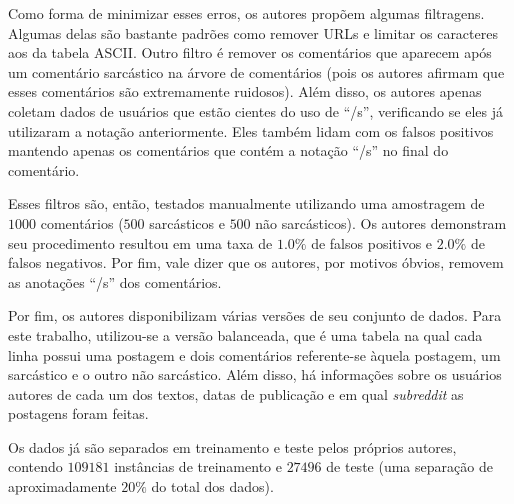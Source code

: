 Como forma de minimizar esses erros, os autores propõem algumas filtragens.
Algumas delas são bastante padrões como remover URLs e limitar os caracteres aos
da tabela ASCII. Outro filtro é remover os comentários que aparecem após um
comentário sarcástico na árvore de comentários (pois os autores afirmam que
esses comentários são extremamente ruidosos). Além disso, os autores apenas
coletam dados de usuários que estão cientes do uso de ``/s'', verificando se
eles já utilizaram a notação anteriormente. Eles também lidam com os falsos
positivos mantendo apenas os comentários que contém a notação ``/s'' no final do
comentário.

Esses filtros são, então, testados manualmente utilizando uma amostragem de
$1000$ comentários ($500$ sarcásticos e $500$ não sarcásticos). Os autores
demonstram seu procedimento resultou em uma taxa de $1.0\%$ de falsos positivos
e $2.0\%$ de falsos negativos. Por fim, vale dizer que os autores, por motivos
óbvios, removem as anotações ``/s'' dos comentários.

Por fim, os autores disponibilizam várias versões de seu conjunto de dados. Para
este trabalho, utilizou-se a versão balanceada, que é uma tabela na qual cada
linha possui uma postagem e dois comentários referente-se àquela postagem, um
sarcástico e o outro não sarcástico. Além disso, há informações sobre os
usuários autores de cada um dos textos, datas de publicação e em qual
\textit{subreddit} as postagens foram feitas.

Os dados já são separados em treinamento e teste pelos próprios autores,
contendo $109181$ instâncias de treinamento e $27496$ de teste (uma
separação de aproximadamente $20\%$ do total dos dados).
